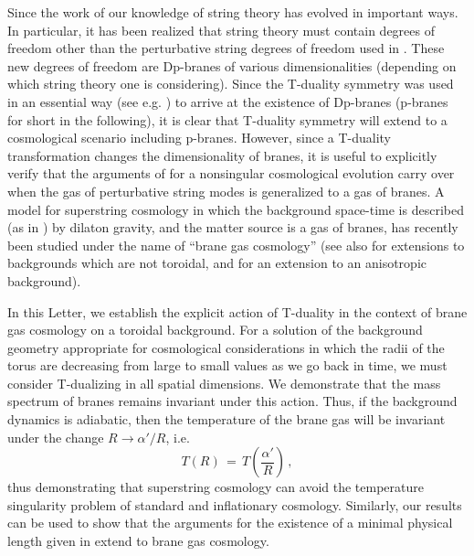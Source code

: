 \documentclass[a4paper,twocolumn,nofootinbib,tightenlines,prd,aps,
               superscriptaddress]{revtex4} %
\newcommand{\al}{\alpha}
\begin{document}
Since the work of \cite{Brandenberger:1989aj} our knowledge of
string theory has evolved in important ways. In particular, it has
been realized \cite{Polchinski:1995mt} that string theory must
contain degrees of freedom other than the perturbative string
degrees of freedom used in \cite{Brandenberger:1989aj}. These new
degrees of freedom are Dp-branes of various dimensionalities
(depending on which string theory one is considering). Since the
T-duality symmetry was used in an essential way (see e.g.
\cite{Polchinski:1998rr}) to arrive at the existence of Dp-branes
(p-branes for short in the following), it is clear that T-duality
symmetry will extend to a cosmological scenario including
p-branes. However, since a T-duality transformation changes the
dimensionality of branes, it is useful to explicitly verify that
the arguments of \cite{Brandenberger:1989aj} for a nonsingular
cosmological evolution carry over when the gas of perturbative
string modes is generalized to a gas of branes. A model for
superstring cosmology in which the background space-time is
described (as in \cite{Tseytlin:1992xk,Veneziano:1991ek}) by
dilaton gravity, and the matter source is a gas of branes, has
recently been studied under the name of ``brane gas cosmology''
\cite{Alexander:2000xv,Brandenberger:2001kj} (see also
\cite{Easson:2001fy,Easther:2002mi} for extensions to backgrounds
which are not toroidal, and \cite{Watson:2002nx} for an extension
to an anisotropic background).

In this Letter, we establish the explicit action of T-duality in
the context of brane gas cosmology on a toroidal background. For a
solution of the background geometry appropriate for cosmological
considerations in which the radii of the torus are decreasing from
large to small values as we go back in time, we must consider
T-dualizing in all spatial dimensions. We demonstrate that the
mass spectrum of branes remains invariant under this action. Thus,
if the background dynamics is adiabatic, then the temperature of
the brane gas will be invariant under the change $R \rightarrow
{\al'/ R}$, i.e.
\begin{equation}
T(R) \, = \, T \left(\frac{\al'}{R}\right) \, ,
\end{equation}
thus demonstrating that superstring cosmology can avoid the
temperature singularity problem of standard and inflationary
cosmology. Similarly, our results can be used to show that the
arguments for the existence of a minimal physical length given in
\cite{Brandenberger:1989aj} extend to brane gas cos\-mo\-logy.
\end{document}
